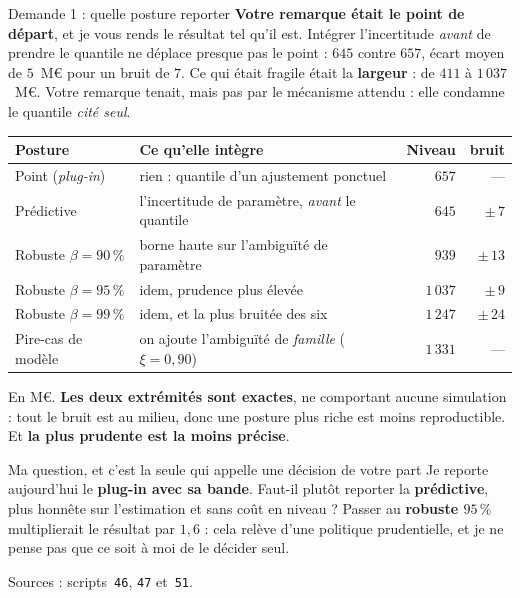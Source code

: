 \documentclass[11pt]{beamer}
\begin{document}
\begin{frame}{Demande 1 : quelle posture reporter}
\scriptsize
\textbf{Votre remarque était le point de départ}, et je vous rends le résultat tel qu'il est.
Intégrer l'incertitude \emph{avant} de prendre le quantile ne déplace presque pas le point : $645$
contre $657$, écart moyen de $5$~M\euro{} pour un bruit de $7$. Ce qui était fragile était la
\textbf{largeur} : de $411$ à $1\,037$~M\euro. Votre remarque tenait, mais pas par le mécanisme
attendu : elle condamne le quantile \emph{cité seul}.
\vspace{-1mm}
\begin{center}\scriptsize
\begin{tabular}{@{}l l r r@{}}
\toprule
\textbf{Posture} & \textbf{Ce qu'elle intègre} & \textbf{Niveau} & \textbf{bruit} \\
\midrule
Point (\emph{plug-in}) & rien : quantile d'un ajustement ponctuel & $657$ & --- \\
Prédictive & l'incertitude de paramètre, \emph{avant} le quantile & $645$ & $\pm\,7$ \\
Robuste $\beta=90\,\%$ & borne haute sur l'ambiguïté de paramètre & $939$ & $\pm\,13$ \\
Robuste $\beta=95\,\%$ & idem, prudence plus élevée & $1\,037$ & $\pm\,9$ \\
Robuste $\beta=99\,\%$ & idem, et la plus bruitée des six & $1\,247$ & $\pm\,24$ \\
Pire-cas de modèle & on ajoute l'ambiguïté de \emph{famille} ($\xi=0{,}90$) & $1\,331$ & --- \\
\bottomrule
\end{tabular}
\end{center}
\vspace{-1mm}
{\scriptsize En M\euro. \textbf{Les deux extrémités sont exactes}, ne comportant aucune
simulation : tout le bruit est au milieu, donc une posture plus riche est moins reproductible. Et
\textbf{la plus prudente est la moins précise}.}
\vspace{1mm}
\begin{block}{Ma question, et c'est la seule qui appelle une décision de votre part}
Je reporte aujourd'hui le \textbf{plug-in avec sa bande}. Faut-il plutôt reporter la
\textbf{prédictive}, plus honnête sur l'estimation et sans coût en niveau ? Passer au
\textbf{robuste $95\,\%$} multiplierait le résultat par $1{,}6$ : cela relève d'une politique
prudentielle, et je ne pense pas que ce soit à moi de le décider seul.
\end{block}
\vspace{-1mm}
{\scriptsize Sources : scripts~\texttt{46}, \texttt{47} et~\texttt{51}.}
\end{frame}
\end{document}
